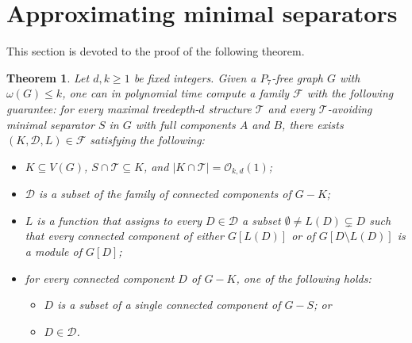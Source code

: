 \documentclass[11pt,a4paper]{article}
\newtheorem{theorem}{Theorem}[section]
\theoremstyle{definition}
\newcommand{\Oh}{\mathcal{O}}
\def\T{\mathcal{T}}
\begin{document}
\section{Approximating minimal separators}\label{sec:approximate}

This section is devoted to the proof of the following theorem.
\begin{theorem}\label{thm:to-bip}
Let $d,k \geq 1$ be fixed integers.
Given a $P_7$-free graph $G$ with $\omega(G) \leq k$, 
one can in polynomial time
compute a family
$\mathcal{F}$ with the following guarantee:
for every maximal treedepth-$d$ structure $\T$
and every $\T$-avoiding minimal separator $S$
in $G$ with full components $A$ and $B$, there
exists $(K,\mathcal{D},L) \in \mathcal{F}$
satisfying the following:
\begin{itemize}
    \item $K \subseteq V(G)$, $S \cap \T \subseteq K$, and $|K \cap \T| = \Oh_{k,d}(1)$;
    \item $\mathcal{D}$ is a subset of the family of connected components of $G-K$;
    \item $L$ is a function that assigns to every $D \in \mathcal{D}$
     a subset $\emptyset \neq L(D) \subsetneq D$ such that
     every connected component of either $G[L(D)]$ or of $G[D \setminus L(D)]$
     is a module of $G[D]$;
    \item for every connected component $D$ of $G-K$, one of the following holds:
    \begin{itemize}
        \item $D$ is a subset of a single connected component of $G-S$; or
        \item $D \in \mathcal{D}$.
    \end{itemize}
\end{itemize}
\end{theorem}
\end{document}
